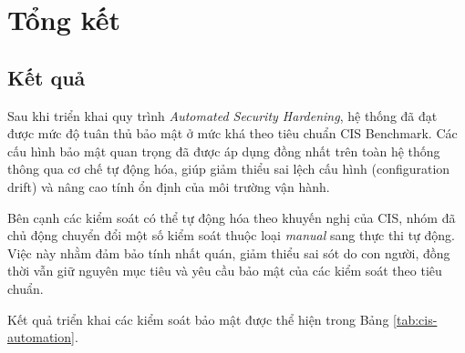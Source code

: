 \chapter{Tổng kết}

\section{Kết quả}

\noindent Sau khi triển khai quy trình \textit{Automated Security Hardening}, hệ thống đã đạt được mức độ tuân thủ bảo mật ở mức khá theo tiêu chuẩn CIS Benchmark. Các cấu hình bảo mật quan trọng đã được áp dụng đồng nhất trên toàn hệ thống thông qua cơ chế tự động hóa, giúp giảm thiểu sai lệch cấu hình (configuration drift) và nâng cao tính ổn định của môi trường vận hành.

\noindent Bên cạnh các kiểm soát có thể tự động hóa theo khuyến nghị của CIS, nhóm đã chủ động chuyển đổi một số kiểm soát thuộc loại \textit{manual} sang thực thi tự động. Việc này nhằm đảm bảo tính nhất quán, giảm thiểu sai sót do con người, đồng thời vẫn giữ nguyên mục tiêu và yêu cầu bảo mật của các kiểm soát theo tiêu chuẩn.

\noindent Kết quả triển khai các kiểm soát bảo mật được thể hiện trong Bảng \ref{tab:cis-automation}.

